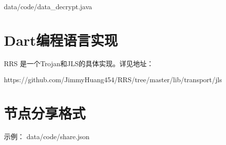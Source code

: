  {data/code/data_decrypt.java}

\section{Dart编程语言实现}
RRS 是一个Trojan和JLS的具体实现。详见地址：

https://github.com/JimmyHuang454/RRS/tree/master/lib/transport/jls

\section{节点分享格式}
示例：
 {data/code/share.json}

